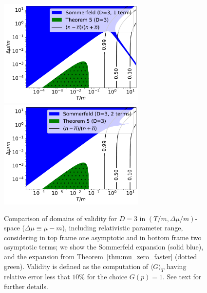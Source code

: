 \documentclass[sn-mathphys,Numbered]{sn-jnl}
\newcommand{\rTh}[1]{Theorem~{\ref{#1}}}
\begin{document}
\begin{figure}   %
\centering
\includegraphics[width=0.65\textwidth]{./plot/Sommerfeld_vs_ours_regions_D3_1_term_part_antipart.pdf}\\
\includegraphics[width=0.65\textwidth]{./plot/Sommerfeld_vs_ours_regions_D3_2_terms_part_antipart.pdf}
\caption{Comparison of domains of validity for $D=3$ in $(T/m,\Delta\mu/m)$-space ($\Delta\mu\equiv\mu-m$), including relativistic parameter range, considering  in top frame one asymptotic and in  bottom frame two asymptotic terms; we show the Sommerfeld expansion (solid blue), and the expansion from \rTh{thm:mu_zero_faster} (dotted green). Validity is defined as the computation of $\langle G\rangle_T$ having relative error less that $10\%$ for the choice $G(p)=1$. See text for further details.}\label{fig:Thm3_vs_Sommerfeld_regions_terms_comp_part_antipart}
\end{figure}
\end{document}
